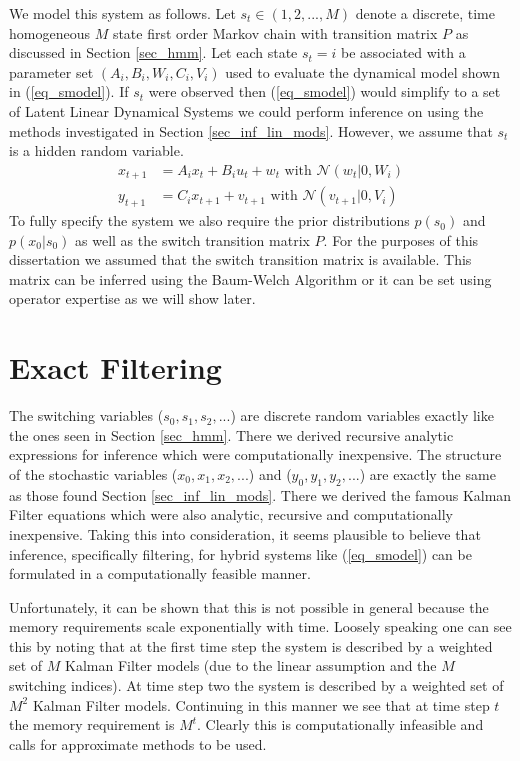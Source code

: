 We model this system as follows. Let $s_t \in (1,2,..., M)$ denote a discrete, time homogeneous $M$ state first order Markov chain with transition matrix $P$ as discussed in Section \ref{sec_hmm}. Let each state $s_t=i$ be associated with a parameter set $\left(A_i, B_i, W_i, C_i, V_i \right)$ used to evaluate the dynamical model shown in (\ref{eq_smodel}). If $s_t$ were observed then (\ref{eq_smodel}) would simplify to a set of Latent Linear Dynamical Systems we could perform inference on using the methods investigated in Section \ref{sec_inf_lin_mods}. However, we assume that $s_t$ is a hidden random variable.
\begin{equation}
\begin{aligned}
x_{t+1} &= A_ix_t + B_iu_t + w_{t} \text{ with } \mathcal{N}(w_{t}|0,W_i) \\
y_{t+1} &= C_ix_{t+1} + v_{t+1}  \text{ with } \mathcal{N}(v_{t+1}|0,V_i)
\end{aligned}
\label{eq_smodel}
\end{equation}
To fully specify the system we also require the prior distributions $p(s_0)$ and $p(x_0|s_0)$ as well as the switch transition matrix $P$. For the purposes of this dissertation we assumed that the switch transition matrix is available. This matrix can be inferred using the Baum-Welch Algorithm \cite{murphy1} or it can be set using operator expertise as we will show later.

\section{Exact Filtering}
The switching variables ($s_0, s_1, s_2,...$) are discrete random variables exactly like the ones seen in Section \ref{sec_hmm}. There we derived recursive analytic expressions for inference which were computationally inexpensive. The structure of the stochastic variables ($x_0, x_1,x_2,...$) and ($y_0,y_1, y_2,...$) are exactly the same as those found Section \ref{sec_inf_lin_mods}. There we derived the famous Kalman Filter equations which were also analytic, recursive and computationally inexpensive. Taking this into consideration, it seems plausible to believe that inference, specifically filtering, for hybrid systems like (\ref{eq_smodel}) can be formulated in a computationally feasible manner. 

Unfortunately, it can be shown that this is not possible in general \cite{lerner}\cite{murphy3} because the memory requirements scale exponentially with time. Loosely speaking one can see this by noting that at the first time step the system is described by a weighted set of $M$ Kalman Filter models (due to the linear assumption and the $M$ switching indices). At time step two the system is described by a weighted set of $M^2$ Kalman Filter models. Continuing in this manner we see that at time step $t$ the memory requirement is $M^t$. Clearly this is computationally infeasible and calls for approximate methods to be used. 

